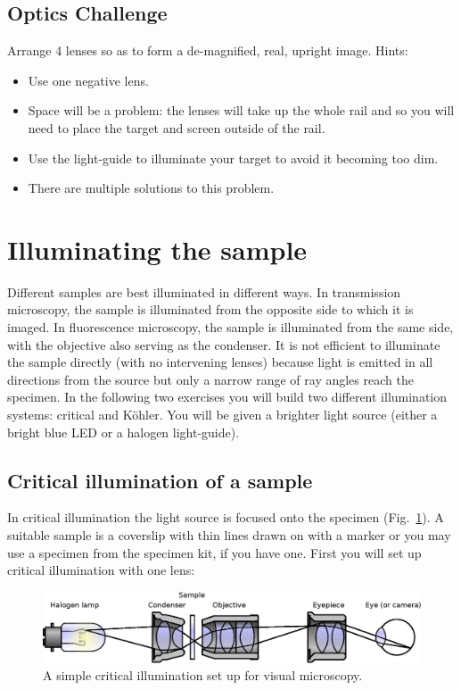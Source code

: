 \documentclass[a4paper]{report}
\begin{document}
\subsection{Optics Challenge}
Arrange 4 lenses so as to form a de-magnified, real, upright
image. Hints: 
\begin{itemize}
\item Use one negative lens.
\item Space will be a problem: the lenses will take up the whole rail
  and so you will need to place the target and screen outside of the
  rail. 
\item Use the light-guide to illuminate your target to avoid it
  becoming too dim. 
\item There are multiple solutions to this problem.
\end{itemize}


\clearpage
\section{Illuminating the sample}
Different samples are best illuminated in different ways.
In transmission microscopy, the sample is illuminated from the opposite side to which it is imaged. 
In fluorescence microscopy, the sample is illuminated from the same side, with the objective also serving as the condenser. 
It is not efficient to illuminate the sample directly (with no intervening lenses) because light is emitted in all directions from the source but only a narrow range of ray angles reach the specimen. 
In the following two exercises you will build two different illumination systems: critical and K\"{o}hler. 
You will be given a brighter light source (either a bright blue LED or a halogen light-guide).


\subsection{Critical illumination of a sample}
In critical illumination the light source is focused onto the specimen (Fig.~\ref{critIlum}).
A suitable sample is a coverslip with thin lines drawn on with a marker or you may use a specimen from the specimen kit, if you have one.
First you will set up critical illumination with one lens:

\begin{figure}[h]
\center
\includegraphics[width=5in]{Critical_Illumination.eps}
\caption{A simple critical illumination set up for visual microscopy.}
\label{critIlum}
\end{figure}
\end{document}
